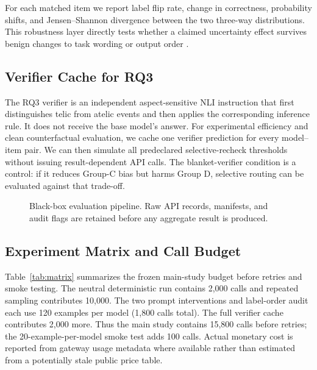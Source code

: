 \documentclass[letterpaper]{article}
\begin{document}
For each matched item we report label flip rate, change in correctness, probability shifts, and Jensen--Shannon divergence between the two three-way distributions. This robustness layer directly tests whether a claimed uncertainty effect survives benign changes to task wording or output order \citep{cox-etal-2025-mapping}.

\subsection{Verifier Cache for RQ3}
The RQ3 verifier is an independent aspect-sensitive NLI instruction that first distinguishes telic from atelic events and then applies the corresponding inference rule. It does not receive the base model's answer. For experimental efficiency and clean counterfactual evaluation, we cache one verifier prediction for every model--item pair. We can then simulate all predeclared selective-recheck thresholds without issuing result-dependent API calls. The blanket-verifier condition is a control: if it reduces Group-C bias but harms Group D, selective routing can be evaluated against that trade-off.

\begin{figure}[t]
\centering
\resizebox{\columnwidth}{!}{}
\caption{Black-box evaluation pipeline. Raw API records, manifests, and audit flags are retained before any aggregate result is produced.}
\label{fig:pipeline}
\end{figure}

\subsection{Experiment Matrix and Call Budget}
Table~\ref{tab:matrix} summarizes the frozen main-study budget before retries and smoke testing. The neutral deterministic run contains 2,000 calls and repeated sampling contributes 10,000. The two prompt interventions and label-order audit each use 120 examples per model (1,800 calls total). The full verifier cache contributes 2,000 more. Thus the main study contains 15,800 calls before retries; the 20-example-per-model smoke test adds 100 calls. Actual monetary cost is reported from gateway usage metadata where available rather than estimated from a potentially stale public price table.
\end{document}
